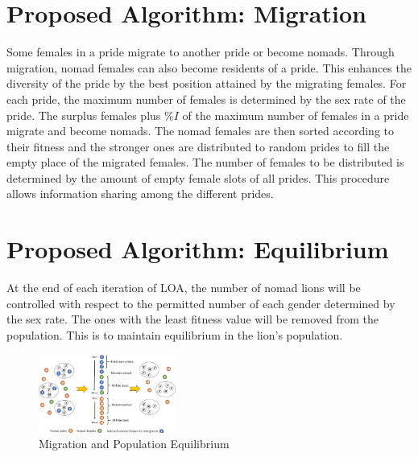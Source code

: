 \section{Proposed Algorithm: Migration}
Some females in a pride migrate to another pride or become nomads. Through migration, nomad females can also become residents of a pride. This enhances the diversity of the pride by the best position attained by the migrating females. For each pride, the maximum number of females is determined by the sex rate of the pride. The surplus females plus $\%I$ of the maximum number of females in a pride migrate and become nomads. The nomad females are then sorted according to their fitness and the stronger ones are distributed to random prides to fill the empty place of the migrated females. The number of females to be distributed is determined by the amount of empty female slots of all prides. This procedure allows information sharing among the different prides.

\section{Proposed Algorithm: Equilibrium}
At the end of each iteration of LOA, the number of nomad lions will be controlled with respect to the permitted number of each gender determined by the sex rate. The ones with the least fitness value will be removed from the population. This is to maintain equilibrium in the lion's population.

\begin{figure}[H]
\begin{center}
\includegraphics[width=0.4\textwidth]{img/equilibrium/equilibrium}
\caption{Migration and Population Equilibrium \cite{loa_2016}}
\end{center}
\end{figure}

